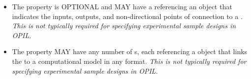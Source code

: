\begin{itemize}
\item \label{sec:sbol:hasInterface}
The  property is OPTIONAL and MAY have a  referencing an  object that indicates the inputs, outputs, and non-directional points of connection to a .
{\em This is not typically required for specifying experimental sample designs in OPIL.}

\item \label{sec:sbol:hasModel}
The  property MAY have any number of s, each referencing a  object that links the  to a computational model in any format.
{\em This is not typically required for specifying experimental sample designs in OPIL.}
\end{itemize}

%
%
%
%
%
%
%
